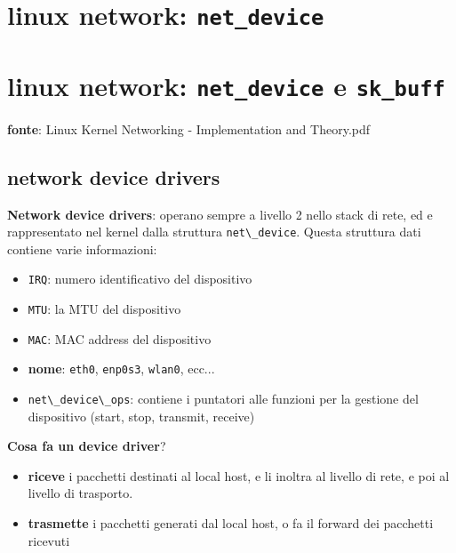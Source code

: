 \section{\texorpdfstring{linux network:
\texttt{net\_device}}{linux network: net\_device}}\label{linux-network-net_device}

\section{\texorpdfstring{linux network: \texttt{net\_device} e
\texttt{sk\_buff}}{linux network: net\_device e sk\_buff}}\label{linux-network-net_device-e-sk_buff}

\textbf{fonte}: Linux Kernel Networking - Implementation and Theory.pdf

\subsection{network device drivers}\label{network-device-drivers}

\textbf{Network device drivers}: operano sempre a livello 2 nello stack
di rete, ed e\textquotesingle{} rappresentato nel kernel dalla struttura
\passthrough{\lstinline!net\_device!}. Questa struttura dati contiene
varie informazioni:

\begin{itemize}
\tightlist
\item
  \passthrough{\lstinline!IRQ!}: numero identificativo del dispositivo
\item
  \passthrough{\lstinline!MTU!}: la MTU del dispositivo
\item
  \passthrough{\lstinline!MAC!}: MAC address del dispositivo
\item
  \textbf{nome}: \passthrough{\lstinline!eth0!},
  \passthrough{\lstinline!enp0s3!}, \passthrough{\lstinline!wlan0!},
  ecc...
\item
  \passthrough{\lstinline!net\_device\_ops!}: contiene i puntatori alle
  funzioni per la gestione del dispositivo (start, stop, transmit,
  receive)
\end{itemize}

\textbf{Cosa fa un device driver}?

\begin{itemize}
\tightlist
\item
  \textbf{riceve} i pacchetti destinati al local host, e li inoltra al
  livello di rete, e poi al livello di trasporto.
\item
  \textbf{trasmette} i pacchetti generati dal local host, o fa il
  forward dei pacchetti ricevuti
\end{itemize}

